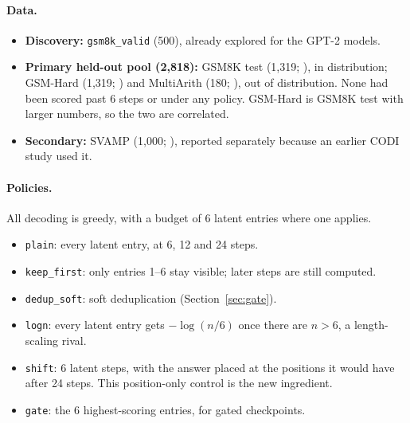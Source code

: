 \documentclass[11pt]{article}
\newcommand{\pol}[1]{\texttt{#1}}
\begin{document}
\paragraph{Data.}
\begin{itemize}
  \item \textbf{Discovery:} \texttt{gsm8k\_valid} (500), already explored for the GPT-2 models.
  \item \textbf{Primary held-out pool (2,818):} GSM8K test (1,319; \citealp{cobbe2021gsm8k}), in distribution; GSM-Hard
    (1,319; \citealp{gao2023pal}) and MultiArith (180; \citealp{roy2015multiarith}), out of distribution. None had been
    scored past 6 steps or under any policy. GSM-Hard is GSM8K test with larger numbers, so the two are correlated.
  \item \textbf{Secondary:} SVAMP (1,000; \citealp{patel2021svamp}), reported separately because an earlier CODI study used it.
\end{itemize}

\paragraph{Policies.} All decoding is greedy, with a budget of 6 latent entries where one applies.
\begin{itemize}
  \item \pol{plain}: every latent entry, at 6, 12 and 24 steps.
  \item \pol{keep\_first}: only entries 1--6 stay visible; later steps are still computed.
  \item \pol{dedup\_soft}: soft deduplication (Section~\ref{sec:gate}).
  \item \pol{logn}: every latent entry gets $-\log(n/6)$ once there are $n > 6$, a length-scaling rival.
  \item \pol{shift}: 6 latent steps, with the answer placed at the positions it would have after 24 steps. This
    position-only control is the new ingredient.
  \item \pol{gate}: the 6 highest-scoring entries, for gated checkpoints.
\end{itemize}
\end{document}
